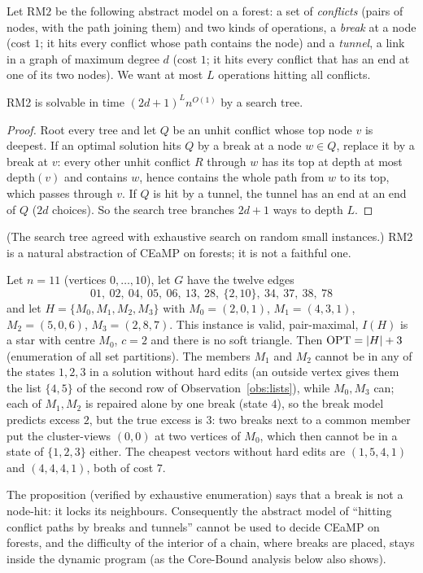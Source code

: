  Let $\mathrm{RM2}$ be the following abstract model on a forest: a set of \emph{conflicts} (pairs of nodes, with the path joining them) and two kinds of operations, a \emph{break} at a node (cost $1$; it hits every conflict whose path contains the node) and a \emph{tunnel}, a link in a graph of maximum degree $d$ (cost $1$; it hits every conflict that has an end at one of its two nodes). We want at most $L$ operations hitting all conflicts.
\begin{proposition}\label{prop:RM2}
RM2 is solvable in time $(2d+1)^{L}n^{O(1)}$ by a search tree.
\end{proposition}
\begin{proof}
Root every tree and let $Q$ be an unhit conflict whose top node $v$ is deepest. If an optimal solution hits $Q$ by a break at a node $w\in Q$, replace it by a break at $v$: every other unhit conflict $R$ through $w$ has its top at depth at most $\mathrm{depth}(v)$ and contains $w$, hence contains the whole path from $w$ to its top, which passes through $v$. If $Q$ is hit by a tunnel, the tunnel has an end at an end of $Q$ ($2d$ choices). So the search tree branches $2d+1$ ways to depth $L$.
\end{proof}
(The search tree agreed with exhaustive search on random small instances.) RM2 is a natural abstraction of CEaMP on forests; it is not a faithful one.
\begin{proposition}\label{prop:hub}
Let $n=11$ (vertices $0,\dots,10$), let $G$ have the twelve edges
\[01,\ 02,\ 04,\ 05,\ 06,\ 13,\ 28,\ \{2,10\},\ 34,\ 37,\ 38,\ 78\]
and let $H=\{M_0,M_1,M_2,M_3\}$ with $M_0=(2,0,1)$, $M_1=(4,3,1)$, $M_2=(5,0,6)$, $M_3=(2,8,7)$. This instance is valid, pair-maximal, $I(H)$ is a star with centre $M_0$, $c=2$ and there is no soft triangle. Then $\mathrm{OPT}=|H|+3$ (enumeration of all set partitions). The members $M_1$ and $M_2$ cannot be in any of the states $1,2,3$ in a solution without hard edits (an outside vertex gives them the list $\{4,5\}$ of the second row of Observation~\ref{obs:lists}), while $M_0,M_3$ can; each of $M_1,M_2$ is repaired alone by one break (state $4$), so the break model predicts excess $2$, but the true excess is $3$: two breaks next to a common member put the cluster-views $(0,0)$ at two vertices of $M_0$, which then cannot be in a state of $\{1,2,3\}$ either. The cheapest vectors without hard edits are $(1,5,4,1)$ and $(4,4,4,1)$, both of cost $7$.
\end{proposition}
The proposition (verified by exhaustive enumeration) says that a break is not a node-hit: it locks its neighbours. Consequently the abstract model of ``hitting conflict paths by breaks and tunnels'' cannot be used to decide CEaMP on forests, and the difficulty of the interior of a chain, where breaks are placed, stays inside the dynamic program (as the Core-Bound analysis below also shows).

